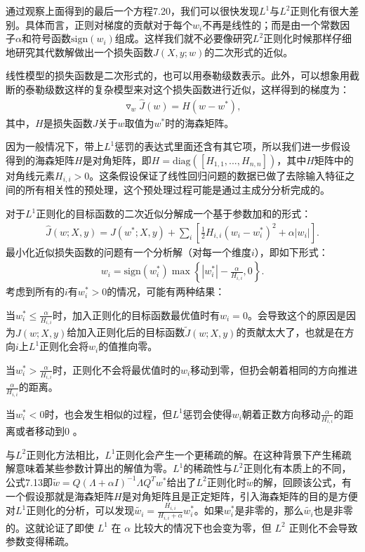 通过观察上面得到的最后一个方程7.20，我们可以很快发现$L^1$与$L^2$正则化有很大差别。具体而言，正则对梯度的贡献对于每个$w_i$不再是线性的；而是由一个常数因子$\alpha$和符号函数$\text{sign}(w_i)$组成。这样我们就不必要像研究$L^2$正则化时候那样仔细地研究其代数解做出一个损失函数$J(X, y; w)$的二次形式的近似。

线性模型的损失函数是二次形式的，也可以用泰勒级数表示。此外，可以想象用截断的泰勒级数这样的复杂模型来对这个损失函数进行近似，这样得到的梯度为：
$$
\begin{aligned}
	\triangledown_w \hat{J} (w) = H(w - w^*),
\end{aligned}
$$
其中，$H$是损失函数$J$关于$w$取值为$w^*$时的海森矩阵。

因为一般情况下，带上$L^1$惩罚的表达式里面还含有其它项，所以我们进一步假设得到的海森矩阵$H$是对角矩阵，即$H = \text{diag}([H_{1,1}, ..., H_{n,n}])$，其中$H$矩阵中的对角线元素$H_{i,i} > 0$。这条假设保证了线性回归问题的数据已做了去除输入特征之间的所有相关性的预处理，这个预处理过程可能是通过主成分分析完成的。

对于$L^1$正则化的目标函数的二次近似分解成一个基于参数加和的形式：
$$
\begin{aligned}
	\hat{J}(w;X,y)=J(w^*;X,y)+\sum_i\left [ \frac{1}{2} H_{i,i} (w_i - w_i^*)^2 + \alpha |w_i| \right ].
\end{aligned}
$$
最小化近似损失函数的问题有一个分析解（对每一个维度$i$），即如下形式：
$$
\begin{aligned}
	w_i = \text{sign}(w_i^*) \max\left \{ |w_i^*| - \frac{\alpha}{H_{i,i}}, 0 \right \}.
\end{aligned}
$$
考虑到所有的$i$有$w_i^* > 0$的情况，可能有两种结果：

当$w_i^* \leq \frac{\alpha}{H_{i,i}}$时，加入正则化的目标函数最优值时有$w_i = 0$。会导致这个的原因是因为$J(w; X, y)$给加入正则化后的目标函数$\widetilde{J}(w; X, y)$的贡献太大了，也就是在方向$i$上$L^1$正则化会将$w_i$的值推向零。

当$w_i^* > \frac{\alpha}{H_{i,i}}$时，正则化不会将最优值时的$w_i$移动到零，但扔会朝着相同的方向推进$\frac{\alpha}{H_{i,i}}$的距离。

当$w_i^* < 0$时，也会发生相似的过程，但$L^1$惩罚会使得$w_i$朝着正数方向移动$\frac{\alpha}{H_{i,i}}$的距离或者移动到$0$ 。

与$L^2$正则化方法相比，$L^1$正则化会产生一个更稀疏的解。在这种背景下产生稀疏解意味着某些参数计算出的解值为零。$L^1$的稀疏性与$L^2$正则化有本质上的不同，公式7.13即$\widetilde{w} = Q(\Lambda + \alpha I)^{-1} \Lambda Q^T w^*$给出了$L^2$正则化时$\widetilde{w}$的解，回顾该公式，有一个假设那就是海森矩阵$H$是对角矩阵且是正定矩阵，引入海森矩阵的目的是方便对$L^1$正则化的分析，可以发现$\widetilde{w_i} = \frac{H_{i,i}}{H_{i,i} + \alpha} w_i^*$。如果$w_i^*$是非零的，那么$\widetilde{w_i}$也是非零的。这就论证了即使 $L^1$ 在 $\alpha$ 比较大的情况下也会变为零，但 $L^2$ 正则化不会导致参数变得稀疏。

